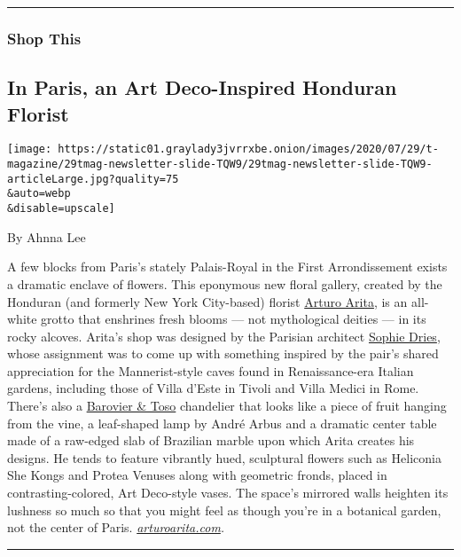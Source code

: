 \begin{center}\rule{0.5\linewidth}{\linethickness}\end{center}

\hypertarget{shop-this}{%
\subsubsection{Shop This}\label{shop-this}}

\hypertarget{in-paris-an-art-deco-inspired-honduran-florist}{%
\subsection{In Paris, an Art Deco-Inspired Honduran
Florist}\label{in-paris-an-art-deco-inspired-honduran-florist}}

\texttt{[image: https://static01.graylady3jvrrxbe.onion/images/2020/07/29/t-magazine/29tmag-newsletter-slide-TQW9/29tmag-newsletter-slide-TQW9-articleLarge.jpg?quality=75\\\&auto=webp\\\&disable=upscale]}

By Ahnna Lee

A few blocks from Paris's stately Palais-Royal in the First
Arrondissement exists a dramatic enclave of flowers. This eponymous new
floral gallery, created by the Honduran (and formerly New York
City-based) florist \href{https://www.instagram.com/arturoarita/}{Arturo
Arita}, is an all-white grotto that enshrines fresh blooms --- not
mythological deities --- in its rocky alcoves. Arita's shop was designed
by the Parisian architect \href{https://www.sophiedries.com/}{Sophie
Dries}, whose assignment was to come up with something inspired by the
pair's shared appreciation for the Mannerist-style caves found in
Renaissance-era Italian gardens, including those of Villa d'Este in
Tivoli and Villa Medici in Rome. There's also a
\href{https://www.barovier.com/en/collections/chandeliers}{Barovier \&
Toso} chandelier that looks like a piece of fruit hanging from the vine,
a leaf-shaped lamp by André Arbus and a dramatic center table made of a
raw-edged slab of Brazilian marble upon which Arita creates his designs.
He tends to feature vibrantly hued, sculptural flowers such as Heliconia
She Kongs and Protea Venuses along with geometric fronds, placed in
contrasting-colored, Art Deco-style vases. The space's mirrored walls
heighten its lushness so much so that you might feel as though you're in
a botanical garden, not the center of Paris.
\href{https://www.arturoarita.com/}{\emph{arturoarita.com}}\emph{.}

\begin{center}\rule{0.5\linewidth}{\linethickness}\end{center}

